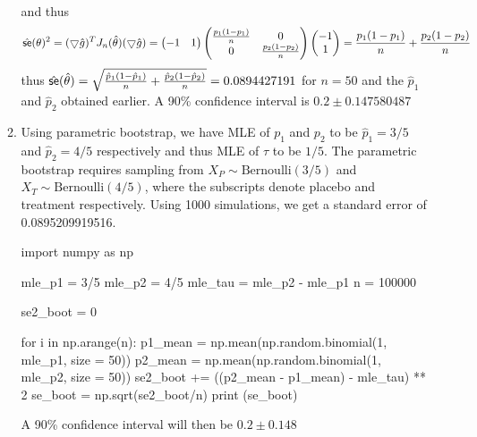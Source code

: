 \documentclass[a4paper,10pt]{article}
\theoremstyle{definition}
\begin{document}
\begin{enumerate}
\begin{enumerate}
\begin{align*}
\end{align*}
and thus
\begin{align*}
\hat{\text{\sffamily se}}(\theta)^2=(\bigtriangledown \hat{g})^T J_n(\hat{\theta})(\bigtriangledown \hat{g})=\begin{pmatrix}-1 &1 \end{pmatrix}\begin{pmatrix} \frac{p_1(1-p_1)}{n} & 0 \\ 0 & \frac{p_2(1-p_2)}{n}\end{pmatrix}\begin{pmatrix}-1 \\1\end{pmatrix} = \frac{p_1(1-p_1)}{n} + \frac{p_2(1-p_2)}{n}
\end{align*}
thus $\hat{\text{\sffamily se}}(\hat{\theta}) = \sqrt{\frac{\hat{p}_1(1-\hat{p}_1)}{n} + \frac{\hat{p}_2(1-\hat{p}_2)}{n}}=0.0894427191$ for $n=50$ and the $\hat{p}_1$ and $\hat{p}_2$ obtained earlier. A 90\% confidence interval is $0.2\pm 0.147580487$


\item Using parametric bootstrap, we have {\sffamily MLE} of $p_1$ and $p_2$ to be $\hat{p}_1 = 3/5$ and $\hat{p}_2 = 4/5$ respectively and thus {\sffamily MLE} of $\tau$ to be $1/5$. The parametric bootstrap requires sampling from $X_P \sim \text{Bernoulli}(3/5)$ and $X_T \sim \text{Bernoulli}(4/5)$, where the subscripts denote placebo and treatment respectively. Using 1000 simulations, we get a standard error of 0.0895209919516.
\begin{python}
import numpy as np

mle_p1 = 3/5
mle_p2 = 4/5
mle_tau = mle_p2 - mle_p1
n = 100000

se2_boot = 0

for i in np.arange(n):
    p1_mean = np.mean(np.random.binomial(1, mle_p1, size = 50))
    p2_mean = np.mean(np.random.binomial(1, mle_p2, size = 50))
    se2_boot += ((p2_mean - p1_mean) - mle_tau) ** 2
se_boot = np.sqrt(se2_boot/n)
print (se_boot)
\end{python}
A 90\% confidence interval will then be $0.2 \pm 0.148$




\end{enumerate}
\end{enumerate}
\end{document}
